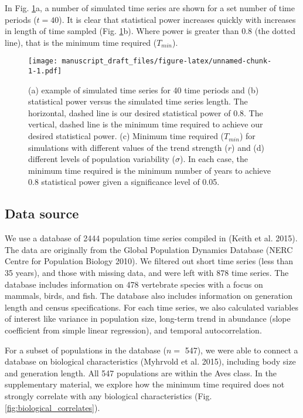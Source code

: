 \documentclass[12pt,]{article}
\begin{document}
In Fig. \ref{fig:theoretical_approach}a, a number of simulated time
series are shown for a set number of time periods (\(t=40\)). It is
clear that statistical power increases quickly with increases in length
of time sampled (Fig. \ref{fig:theoretical_approach}b). Where power is
greater than 0.8 (the dotted line), that is the minimum time required
(\(T_{min}\)).

\begin{figure}[htbp]
\centering
\texttt{[image: manuscript\_draft\_files/figure-latex/unnamed-chunk-1-1.pdf]}
\caption{(a) example of simulated time series for 40 time periods and
(b) statistical power versus the simulated time series length. The
horizontal, dashed line is our desired statistical power of 0.8. The
vertical, dashed line is the minimum time required to achieve our
desired statistical power. (c) Minimum time required (\(T_{min}\)) for
simulations with different values of the trend strength (\(r\)) and (d)
different levels of population variability (\(\sigma\)). In each case,
the minimum time required is the minimum number of years to achieve 0.8
statistical power given a significance level of
0.05.\label{fig:theoretical_approach}}
\end{figure}

\subsection{Data source}\label{data-source}

We use a database of 2444 population time series compiled in (Keith et
al. 2015). The data are originally from the Global Population Dynamics
Database (NERC Centre for Population Biology 2010). We filtered out
short time series (less than 35 years), and those with missing data, and
were left with 878 time series. The database includes information on 478
vertebrate species with a focus on mammals, birds, and fish. The
database also includes information on generation length and census
specifications. For each time series, we also calculated variables of
interest like variance in population size, long-term trend in abundance
(slope coefficient from simple linear regression), and temporal
autocorrelation.

For a subset of populations in the database (\(n =\) 547), we were able
to connect a database on biological characteristics (Myhrvold et al.
2015), including body size and generation length. All 547 populations
are within the Aves class. In the supplementary material, we explore how
the minimum time required does not strongly correlate with any
biological characteristics (Fig. \ref{fig:biological_correlates}).
\end{document}
